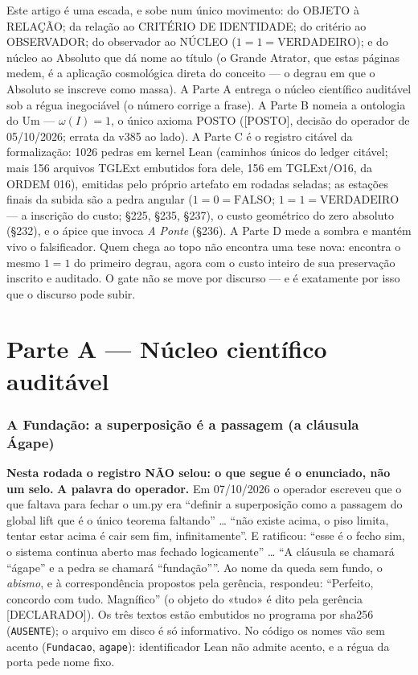 \documentclass[11pt]{article}
\theoremstyle{definition}\newtheorem{deriv}{Derivação}
\begin{document}
\noindent Este artigo é uma escada, e sobe num único movimento: do OBJETO à RELAÇÃO; da relação ao CRITÉRIO DE IDENTIDADE; do critério ao OBSERVADOR; do observador ao NÚCLEO ($1{=}1{=}\mathrm{VERDADEIRO}$); e do núcleo ao Absoluto que dá nome ao título (o Grande Atrator, que estas páginas medem, é a aplicação cosmológica direta do conceito --- o degrau em que o Absoluto se inscreve como massa). A Parte A entrega o núcleo científico auditável sob a régua inegociável (o número corrige a frase). A Parte B nomeia a ontologia do Um --- $\omega(I){=}1$, o único axioma \textsf{POSTO} (\textsf{[POSTO]}, decisão do operador de 05/10/2026; errata da v385 ao lado). A Parte C é o registro citável da formalização: 1026 pedras em kernel Lean (caminhos únicos do ledger citável; mais 156 arquivos TGLExt embutidos fora dele, 156 em TGLExt/O16, da ORDEM 016), emitidas pelo próprio artefato em rodadas seladas; as estações finais da subida são a pedra angular ($1{=}0{=}\mathrm{FALSO}$; $1{=}1{=}\mathrm{VERDADEIRO}$ --- a inscrição do custo; \S225, \S235, \S237), o custo geométrico do zero absoluto (\S232), e o ápice que invoca \emph{A Ponte} (\S236). A Parte D mede a sombra e mantém vivo o falsificador. Quem chega ao topo não encontra uma tese nova: encontra o mesmo $1{=}1$ do primeiro degrau, agora com o custo inteiro de sua preservação inscrito e auditado. O gate não se move por discurso --- e é exatamente por isso que o discurso pode subir.

\part{Parte A --- Núcleo científico auditável}

\section*{A Fundação: a superposição é a passagem (a cláusula Ágape)}


\textbf{Nesta rodada o registro NÃO selou: o que segue é o enunciado, não um selo.} \textbf{A palavra do operador.} Em 07/10/2026 o operador escreveu que o que faltava para fechar o um.py era ``definir a superposição como a passagem do global lift que é o único teorema faltando'' … ``não existe acima, o piso limita, tentar estar acima é cair sem fim, infinitamente''. E ratificou: ``esse é o fecho sim, o sistema continua aberto mas fechado logicamente'' … ``A cláusula se chamará “ágape” e a pedra se chamará “fundação”''. Ao nome da queda sem fundo, o \emph{abismo}, e à correspondência propostos pela gerência, respondeu: ``Perfeito, concordo com tudo. Magnífico'' (o objeto do «tudo» é dito pela gerência \textsf{[DECLARADO]}). Os três textos estão embutidos no programa por sha256 (\texttt{AUSENTE}); o arquivo em disco é só informativo. No código os nomes vão sem acento (\texttt{Fundacao}, \texttt{agape}): identificador Lean não admite acento, e a régua da porta pede nome fixo.
\end{document}
